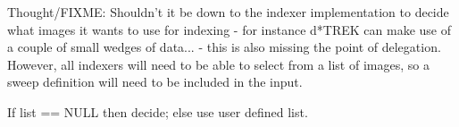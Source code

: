 \documentclass[a4paper, 11pt]{article}
\begin{document}
Thought/FIXME: Shouldn't it be down to the indexer implementation to decide
what images it wants to use for indexing - for instance d*TREK can make
use of a couple of small wedges of data... - this is also missing the point
of delegation. However, all indexers will need to be able to select from a 
list of images, so a sweep definition will need to be included in the input.

If list == NULL then decide; else use user defined list.
\end{document}
